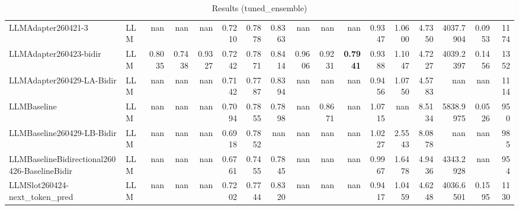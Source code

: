 \begin{table}[htbp]
{\begin{tabular}{ll|rrrrrrrrrrrrrr|r}
LLMAdapter260421-3 & LLM & nan & nan & nan & 0.7210 & 0.7878 & 0.8363 & nan & nan & nan & 0.9347 & 1.0600 & 4.7350 & 4037.7904 & 0.0953 & 1174 \\
LLMAdapter260423-bidir & LLM & 0.8035 & 0.7438 & 0.9327 & 0.7242 & 0.7871 & 0.8414 & 0.9606 & 0.9231 & \textbf{0.7941} & 0.9388 & 1.1047 & 4.7227 & 4039.2397 & 0.1456 & 1352 \\
LLMAdapter260429-LA-Bidir & LLM & nan & nan & nan & 0.7142 & 0.7787 & 0.8394 & nan & nan & nan & 0.9456 & 1.0750 & 4.5783 & nan & nan & 1114 \\
LLMBaseline & LLM & nan & nan & nan & 0.7094 & 0.7855 & 0.7898 & nan & 0.8671 & nan & 1.0715 & nan & 8.5134 & 5838.9975 & 0.0526 & 950 \\
LLMBaseline260429-LB-Bidir & LLM & nan & nan & nan & 0.6918 & 0.7852 & nan & nan & nan & nan & 1.0227 & 2.5543 & 8.0878 & nan & nan & 985 \\
LLMBaselineBidirectional260426-BaselineBidir & LLM & nan & nan & nan & 0.6761 & 0.7455 & 0.7845 & nan & nan & nan & 0.9967 & 1.6478 & 4.9436 & 4343.2928 & nan & 954 \\
LLMSlot260424-next\_token\_pred & LLM & nan & nan & nan & 0.7202 & 0.7744 & 0.8320 & nan & nan & nan & 0.9417 & 1.0459 & 4.6248 & 4036.6501 & 0.1595 & 1130 \\
\bottomrule
\end{tabular}
}
\caption{Results (tuned_ensemble)}
\label{tab:results_tuned_ensemble}
\end{table}